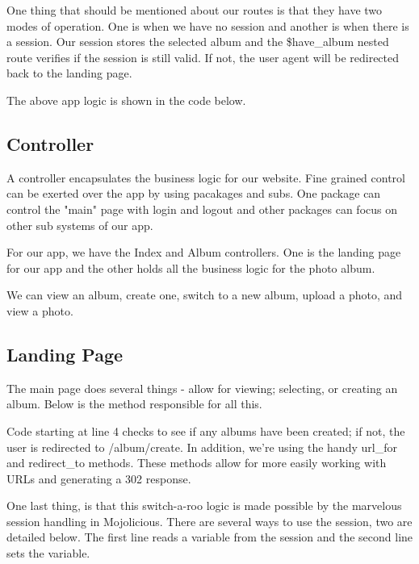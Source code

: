 \documentclass[14pt]{extreport}
\newcommand\Small{\fontsize{12}{13.0}\fontencoding{T1}\selectfont}
\newcommand*\LSTfont{\Small\ttfamily\SetTracking{encoding=*}{-60}\lsstyle}
\begin{document}
One thing that should be mentioned about our routes is that they have two modes of
operation.  One is when we have no session and another is when there is a session.
Our session stores the selected album and the \$have\_album nested route verifies
if the session is still valid.  If not, the user agent will be redirected back to the
landing page.

The above app logic is shown in the code below.



\subsection{Controller}

A controller encapsulates the business logic for our website.  Fine grained
control can be exerted over the app by using pacakages and subs.  One package
can control the "main" page with login and logout and other packages can focus
on other sub systems of our app.

For our app, we have the Index and Album controllers.  One is the landing page for
our app and the other holds all the business logic for the photo album.

We can view an album, create one, switch to a new album, upload a photo, and
view a photo.

\subsection{Landing Page}

The main page does several things - allow for viewing; selecting, or creating
an album.  Below is the method responsible for all this.



Code starting at line 4 checks to see if any albums have been created; if not,
the user is redirected to /album/create.  In addition, we're using the handy
url\_for and redirect\_to methods. These methods allow for more easily working
with URLs and generating a 302 response.

One last thing, is that this switch-a-roo logic is made possible by the
marvelous session handling in Mojolicious.  There are several ways to use the
session, two are detailed below.  The first line reads a variable from the
session and the second line sets the variable.
\end{document}
